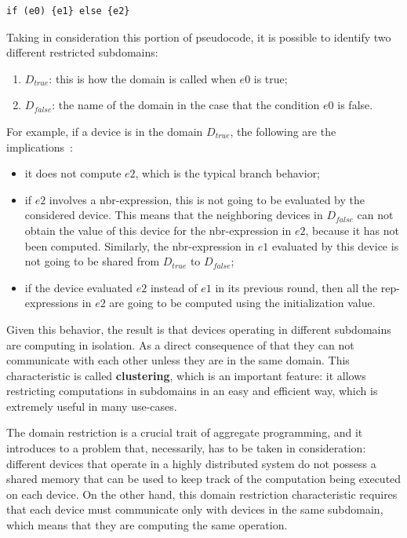 \begin{lstlisting}
if (e0) {e1} else {e2}
\end{lstlisting}
Taking in consideration this portion of pseudocode, it is possible to identify two different restricted subdomains: 
\begin{enumerate}
    \item \textbf{$D_{true}$}: this is how the domain is called when $e0$ is true;
    \item \textbf{$D_{false}$}: the name of the domain in the case that the condition $e0$ is false.
\end{enumerate}
For example, if a device is in the domain $D_{true}$, the following are the implications~\cite{computational_fields_theory}:
\begin{itemize}
    \item it does not compute $e2$, which is the typical branch behavior;
    \item if $e2$ involves a nbr-expression, this is not going to be evaluated by the considered device. This means that the neighboring devices in $D_{false}$ can not obtain the value of this device for the nbr-expression in $e2$, because it has not been computed. Similarly, the nbr-expression in $e1$ evaluated by this device is not going to be shared from $D_{true}$ to $D_{false}$;
    \item if the device evaluated $e2$ instead of $e1$ in its previous round, then all the rep-expressions in $e2$ are going to be computed using the initialization value.
\end{itemize}

Given this behavior, the result is that devices operating in different subdomains are computing in isolation. As a direct consequence of that they can not communicate with each other unless they are in the same domain. This characteristic is called \textbf{clustering}, which is an important feature: it allows restricting computations in subdomains in an easy and efficient way, which is extremely useful in many use-cases.

The domain restriction is a crucial trait of aggregate programming, and it introduces to a problem that, necessarily, has to be taken in consideration: different devices that operate in a highly distributed system do not possess a shared memory that can be used to keep track of the computation being executed on each device. On the other hand, this domain restriction characteristic requires that each device must communicate only with devices in the same subdomain, which means that they are computing the same operation.

